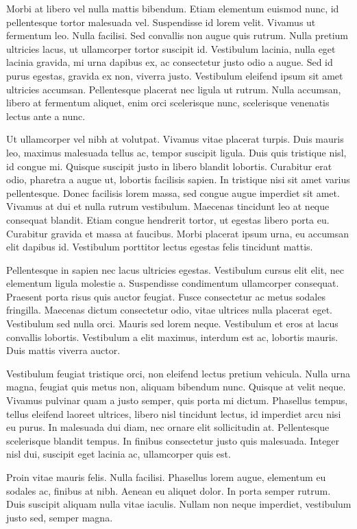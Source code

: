 \documentclass[
	12pt,				%
	a4paper,			%
    openany,
    oneside,
	english,			%
	french,				%
	spanish,			%
	brazil,				%
	]{abntex2}
\begin{document}
Morbi at libero vel nulla mattis bibendum. Etiam elementum euismod nunc, id pellentesque tortor malesuada vel. Suspendisse id lorem velit. Vivamus ut fermentum leo. Nulla facilisi. Sed convallis non augue quis rutrum. Nulla pretium ultricies lacus, ut ullamcorper tortor suscipit id. Vestibulum lacinia, nulla eget lacinia gravida, mi urna dapibus ex, ac consectetur justo odio a augue. Sed id purus egestas, gravida ex non, viverra justo. Vestibulum eleifend ipsum sit amet ultricies accumsan. Pellentesque placerat nec ligula ut rutrum. Nulla accumsan, libero at fermentum aliquet, enim orci scelerisque nunc, scelerisque venenatis lectus ante a nunc.

Ut ullamcorper vel nibh at volutpat. Vivamus vitae placerat turpis. Duis mauris leo, maximus malesuada tellus ac, tempor suscipit ligula. Duis quis tristique nisl, id congue mi. Quisque suscipit justo in libero blandit lobortis. Curabitur erat odio, pharetra a augue ut, lobortis facilisis sapien. In tristique nisi sit amet varius pellentesque. Donec facilisis lorem massa, sed congue augue imperdiet sit amet. Vivamus at dui et nulla rutrum vestibulum. Maecenas tincidunt leo at neque consequat blandit. Etiam congue hendrerit tortor, ut egestas libero porta eu. Curabitur gravida et massa at faucibus. Morbi placerat ipsum urna, eu accumsan elit dapibus id. Vestibulum porttitor lectus egestas felis tincidunt mattis.

Pellentesque in sapien nec lacus ultricies egestas. Vestibulum cursus elit elit, nec elementum ligula molestie a. Suspendisse condimentum ullamcorper consequat. Praesent porta risus quis auctor feugiat. Fusce consectetur ac metus sodales fringilla. Maecenas dictum consectetur odio, vitae ultrices nulla placerat eget. Vestibulum sed nulla orci. Mauris sed lorem neque. Vestibulum et eros at lacus convallis lobortis. Vestibulum a elit maximus, interdum est ac, lobortis mauris. Duis mattis viverra auctor.

Vestibulum feugiat tristique orci, non eleifend lectus pretium vehicula. Nulla urna magna, feugiat quis metus non, aliquam bibendum nunc. Quisque at velit neque. Vivamus pulvinar quam a justo semper, quis porta mi dictum. Phasellus tempus, tellus eleifend laoreet ultrices, libero nisl tincidunt lectus, id imperdiet arcu nisi eu purus. In malesuada dui diam, nec ornare elit sollicitudin at. Pellentesque scelerisque blandit tempus. In finibus consectetur justo quis malesuada. Integer nisl dui, suscipit eget lacinia ac, ullamcorper quis est.

Proin vitae mauris felis. Nulla facilisi. Phasellus lorem augue, elementum eu sodales ac, finibus at nibh. Aenean eu aliquet dolor. In porta semper rutrum. Duis suscipit aliquam nulla vitae iaculis. Nullam non neque imperdiet, vestibulum justo sed, semper magna.
\end{document}
